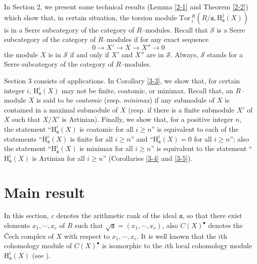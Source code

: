 \documentclass[10pt]{amsart}
\newcommand{\Tor}{\mbox{Tor}\,}
\renewcommand{\H}{\mbox{H}}
\newcommand{\fa}{\mathfrak{a}}
\newcommand{\C}{C}
\begin{document}
In Section 2, we present some technical results (Lemma \ref {2-1} and Theorem \ref {2-2}) which
show that, in certain situation, the torsion module $\Tor_i^R(R/\fa, \H_\fa^j(X))$
is in a Serre subcategory of the category of $R$--modules. Recall that $\mathcal{S}$ is a Serre
subcategory of the category of $R$--modules if for any exact sequence
\begin{equation}\label{1--1}
0\longrightarrow X'\longrightarrow X\longrightarrow X''\longrightarrow 0
\end{equation}
the module $X$ is in $\mathcal{S}$ if and only if $X'$ and $X''$ are in $\mathcal{S}$.
Always, $\mathcal{S}$ stands for a Serre subcategory of the category of $R$--modules.

Section 3 consists of applications. In Corollary \ref {3-3}, we show that, for certain integer $i$, $\H_\fa^i(X)$ may not be finite, coatomic, or minimax. Recall that, an $R$--module $X$ is said to be {\it coatomic} (resp. {\it minimax}) if any submodule of $X$ is contained in a maximal submodule of $X$ (resp. if there is a finite submodule $X'$ of $X$ such that $X/X'$ is Artinian). Finally, we show that, for a positive integer $n$, the statement ``$\H_\fa^i(X)$ is coatomic for all $i\geq n$'' is equivalent to each of the statements ``$\H_\fa^i(X)$ is finite for all $i\geq n$'' and ``$\H_\fa^i(X)= 0$ for all $i\geq n$''; also the statement ``$\H_\fa^i(X)$ is minimax for all $i\geq n$''  is equivalent to the statement ``$\H_\fa^i(X)$ is Artinian for all $i\geq n$'' (Corollaries \ref {3-4} and \ref {3-5}).\\









\section{Main result}
In this section, $c$ denotes the arithmetic rank of the ideal $\fa$,
so that there exist elements $x_1, \cdots, x_c$ of $R$ such that
$\sqrt{\fa}= (x_1, \cdots, x_c)$, also $\C(X)^\bullet$ denotes the
\v{C}ech complex of $X$ with respect to $x_1, \cdots, x_c$. It is
well known that the $i$th cohomology module of $\C(X)^\bullet$ is
isomorphic to the $i$th local cohomology module $\H_\fa^i(X)$ (see
\cite [Theorem 5.1.19] {BS}).
\end{document}
